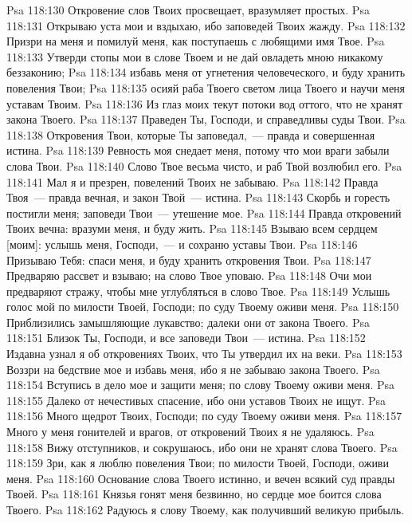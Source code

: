 \vs Psa 118:130 Откровение слов Твоих просвещает, вразумляет простых.
\vs Psa 118:131 Открываю уста мои и вздыхаю, ибо заповедей Твоих жажду.
\rsbpar\vs Psa 118:132 Призри на меня и помилуй меня, как поступаешь с любящими имя Твое.
\vs Psa 118:133 Утверди стопы мои в слове Твоем и не дай овладеть мною никакому беззаконию;
\vs Psa 118:134 избавь меня от угнетения человеческого, и буду хранить повеления Твои;
\vs Psa 118:135 осияй раба Твоего светом лица Твоего и научи меня уставам Твоим.
\vs Psa 118:136 Из глаз моих текут потоки вод оттого, что не хранят закона Твоего.
\vs Psa 118:137 Праведен Ты, Господи, и справедливы суды Твои.
\vs Psa 118:138 Откровения Твои, которые Ты заповедал,~--- правда и совершенная истина.
\vs Psa 118:139 Ревность моя снедает меня, потому что мои враги забыли слова Твои.
\vs Psa 118:140 Слово Твое весьма чисто, и раб Твой возлюбил его.
\vs Psa 118:141 Мал я и презрен,  повелений Твоих не забываю.
\vs Psa 118:142 Правда Твоя~--- правда вечная, и закон Твой~--- истина.
\vs Psa 118:143 Скорбь и горесть постигли меня; заповеди Твои~--- утешение мое.
\vs Psa 118:144 Правда откровений Твоих вечна: вразуми меня, и буду жить.
\vs Psa 118:145 Взываю всем сердцем [моим]: услышь меня, Господи,~--- и сохраню уставы Твои.
\vs Psa 118:146 Призываю Тебя: спаси меня, и буду хранить откровения Твои.
\vs Psa 118:147 Предваряю рассвет и взываю; на слово Твое уповаю.
\vs Psa 118:148 Очи мои предваряют  стражу, чтобы мне углубляться в слово Твое.
\vs Psa 118:149 Услышь голос мой по милости Твоей, Господи; по суду Твоему оживи меня.
\vs Psa 118:150 Приблизились замышляющие лукавство; далеки они от закона Твоего.
\vs Psa 118:151 Близок Ты, Господи, и все заповеди Твои~--- истина.
\vs Psa 118:152 Издавна узнал я об откровениях Твоих, что Ты утвердил их на веки.
\vs Psa 118:153 Воззри на бедствие мое и избавь меня, ибо я не забываю закона Твоего.
\vs Psa 118:154 Вступись в дело мое и защити меня; по слову Твоему оживи меня.
\vs Psa 118:155 Далеко от нечестивых спасение, ибо они уставов Твоих не ищут.
\vs Psa 118:156 Много щедрот Твоих, Господи; по суду Твоему оживи меня.
\vs Psa 118:157 Много у меня гонителей и врагов,  от откровений Твоих я не удаляюсь.
\vs Psa 118:158 Вижу отступников, и сокрушаюсь, ибо они не хранят слова Твоего.
\vs Psa 118:159 Зри, как я люблю повеления Твои; по милости Твоей, Господи, оживи меня.
\vs Psa 118:160 Основание слова Твоего истинно, и вечен всякий суд правды Твоей.
\vs Psa 118:161 Князья гонят меня безвинно, но сердце мое боится слова Твоего.
\vs Psa 118:162 Радуюсь я слову Твоему, как получивший великую прибыль.
